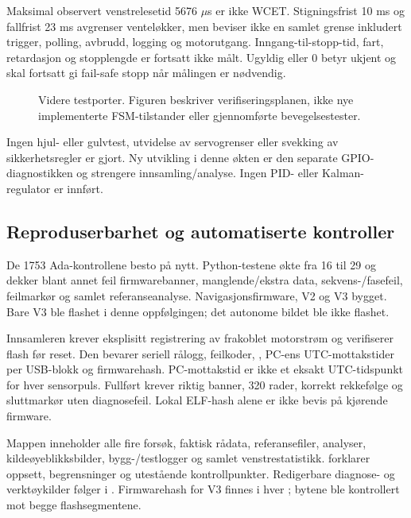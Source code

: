 Maksimal observert venstrelesetid 5676 \(\mu\)s er ikke WCET.
Stigningsfrist 10 ms og fallfrist 23 ms avgrenser venteløkker,
men beviser ikke en samlet grense inkludert trigger, polling,
avbrudd, logging og motorutgang. Inngang-til-stopp-tid, fart,
retardasjon og stopplengde er fortsatt ikke målt.
Ugyldig eller 0 betyr ukjent og skal fortsatt gi fail-safe stopp
når målingen er nødvendig.

\begin{figure}[htbp]
\centering
{}
\caption{Videre testporter. Figuren beskriver verifiseringsplanen,
ikke nye implementerte FSM-tilstander eller gjennomførte bevegelsestester.}
\end{figure}

Ingen hjul- eller gulvtest, utvidelse av servogrenser eller svekking av
sikkerhetsregler er gjort. Ny utvikling i denne økten er den separate
GPIO-diagnostikken og strengere innsamling/analyse. Ingen PID- eller
Kalman-regulator er innført.

\subsection{Reproduserbarhet og automatiserte kontroller}
De 1753 Ada-kontrollene besto på nytt. Python-testene økte fra 16 til
29 og dekker blant annet feil firmwarebanner, manglende/ekstra data,
sekvens-/fasefeil, feilmarkør og samlet referanseanalyse.
Navigasjonsfirmware, V2 og V3 bygget. Bare V3 ble flashet i
denne oppfølgingen; det autonome bildet ble ikke flashet.

Innsamleren krever eksplisitt registrering av frakoblet motorstrøm og
verifiserer flash før reset. Den bevarer seriell rålogg, feilkoder,
, PC-ens UTC-mottakstider per USB-blokk og firmwarehash.
PC-mottakstid er ikke et eksakt UTC-tidspunkt for hver sensorpuls.
Fullført krever riktig banner, 320 rader, korrekt rekkefølge og
sluttmarkør uten diagnosefeil. Lokal ELF-hash alene er ikke bevis
på kjørende firmware.

Mappen  inneholder alle fire forsøk, faktisk rådata,
referansefiler, analyser, kildeøyeblikksbilder, bygg-/testlogger og
samlet venstrestatistikk. 
forklarer oppsett, begrensninger og utestående kontrollpunkter.
Redigerbare diagnose- og verktøykilder følger i
. Firmwarehash for V3 finnes i hver
; bytene ble kontrollert mot begge flashsegmentene.
